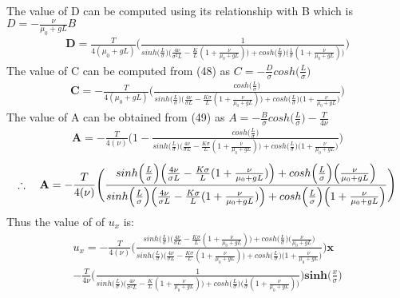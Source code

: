 \documentclass[a4paper,oneside,11pt]{report}
\begin{document}
The value of D can be computed using its relationship with B which is $D = -\frac{\nu}{\mu_0 + gL} B$
\begin{align}
\textbf{D} = \frac{T}{4(\mu_0 + gL)} \Bigg ( \frac{1}{sinh \Big( \frac{L}{\sigma}\Big ) \Big ( \frac{4\nu}{\sigma^2 L} - \frac{K}{L} (1+ \frac{\nu}{\mu_0 + gL}) \Big ) + cosh\Big ( \frac{L}{\sigma} \Big ) \Big (  \frac{1}{\sigma} (1+ \frac{\nu}{\mu_0 + gL}) \Big )} \Bigg)
\end{align}
The value of C can be computed from (48) as $C = -\frac{D}{\sigma}cosh\Big ( \frac{L}{\sigma} \Big )$
\begin{align}
\textbf{C} = -\frac{T}{4(\mu_0 + gL)} \Bigg ( \frac{cosh\Big ( \frac{L}{\sigma} \Big )}{sinh \Big( \frac{L}{\sigma}\Big ) \Big ( \frac{4\nu}{\sigma L} - \frac{K \sigma}{L} (1+ \frac{\nu}{\mu_0 + gL}) \Big ) + cosh\Big ( \frac{L}{\sigma} \Big ) \Big ( 1+ \frac{\nu}{\mu_0 + gL} \Big )} \Bigg)
\end{align}
The value of A can be obtained from (49) as $A = -\frac{B}{\sigma}cosh\Big ( \frac{L}{\sigma} \Big ) -\frac{T}{4\nu}$
\begin{align*}
\textbf{A} = -\frac{T}{4(\nu)} \Bigg ( 1 - \frac{cosh\Big ( \frac{L}{\sigma} \Big )}{sinh \Big( \frac{L}{\sigma}\Big ) \Big ( \frac{4\nu}{\sigma L} - \frac{K \sigma}{L} (1+ \frac{\nu}{\mu_0 + gL}) \Big ) + cosh\Big ( \frac{L}{\sigma} \Big ) \Big ( 1+ \frac{\nu}{\mu_0 + gL} \Big )} \Bigg)
\end{align*}
\begin{align}
\therefore \hspace{0.35cm}
\textbf{A} = -\frac{T}{4(\nu)} \Bigg ( \frac{sinh \Big( \frac{L}{\sigma}\Big ) \Big ( \frac{4\nu}{\sigma L} - \frac{K \sigma}{L} (1+ \frac{\nu}{\mu_0 + gL}) \Big ) + cosh\Big ( \frac{L}{\sigma} \Big ) \Big ( \frac{\nu}{\mu_0 + gL} \Big )}{sinh \Big( \frac{L}{\sigma}\Big ) \Big ( \frac{4\nu}{\sigma L} - \frac{K \sigma}{L} (1+ \frac{\nu}{\mu_0 + gL}) \Big ) + cosh\Big ( \frac{L}{\sigma} \Big ) \Big ( 1+ \frac{\nu}{\mu_0 + gL} \Big )} \Bigg)
\end{align}
Thus the value of of $u_x$ is: 
\begin{align*}
u_x = -\frac{T}{4(\nu)} \Bigg ( \frac{sinh \Big( \frac{L}{\sigma}\Big ) \Big ( \frac{4\nu}{\sigma L} - \frac{K \sigma}{L} (1+ \frac{\nu}{\mu_0 + gL}) \Big ) + cosh\Big ( \frac{L}{\sigma} \Big ) \Big ( \frac{\nu}{\mu_0 + gL} \Big )}{sinh \Big( \frac{L}{\sigma}\Big ) \Big ( \frac{4\nu}{\sigma L} - \frac{K \sigma}{L} (1+ \frac{\nu}{\mu_0 + gL}) \Big ) + cosh\Big ( \frac{L}{\sigma} \Big ) \Big ( 1+ \frac{\nu}{\mu_0 + gL} \Big )} \Bigg)\textbf{x} \\ -\frac{T}{4\nu} \Bigg ( \frac{1}{sinh \Big( \frac{L}{\sigma}\Big ) \Big ( \frac{4\nu}{\sigma^2 L} - \frac{K}{L} (1+ \frac{\nu}{\mu_0 + gL}) \Big ) + cosh\Big ( \frac{L}{\sigma} \Big ) \Big (  \frac{1}{\sigma} (1+ \frac{\nu}{\mu_0 + gL}) \Big )} \Bigg) \textbf{sinh} \Big ( \frac{x}{\sigma} \Big )\\
\end{align*}
\end{document}
